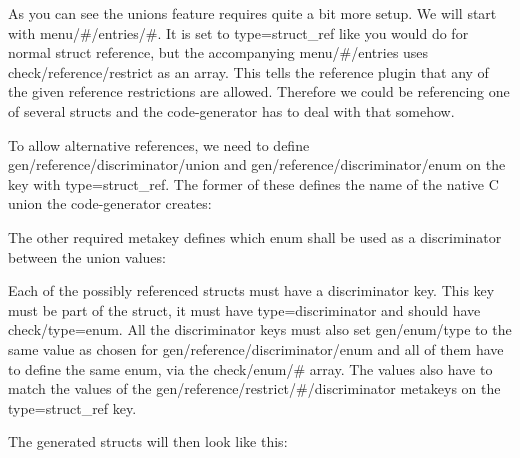 As you can see the unions feature requires quite a bit more setup. We will start with {\ttfamily menu/\#/entries/\#}. It is set to {\ttfamily type=struct\+\_\+ref} like you would do for normal struct reference, but the accompanying {\ttfamily menu/\#/entries} uses {\ttfamily check/reference/restrict} as an array. This tells the {\ttfamily reference} plugin that any of the given reference restrictions are allowed. Therefore we could be referencing one of several structs and the code-\/generator has to deal with that somehow.

To allow alternative references, we need to define {\ttfamily gen/reference/discriminator/union} and {\ttfamily gen/reference/discriminator/enum} on the key with {\ttfamily type=struct\+\_\+ref}. The former of these defines the name of the native C {\ttfamily union} the code-\/generator creates\+:


\begin{DoxyCode}{0}
\DoxyCodeLine{\textcolor{keyword}{typedef} \textcolor{keyword}{union }\{}
\end{DoxyCode}


The other required metakey defines which enum shall be used as a discriminator between the union values\+:


\begin{DoxyCode}{0}
\DoxyCodeLine{\textcolor{keyword}{typedef} \textcolor{keyword}{enum} \{}
\end{DoxyCode}


Each of the possibly referenced structs must have a discriminator key. This key must be part of the struct, it must have {\ttfamily type=discriminator} and should have {\ttfamily check/type=enum}. All the discriminator keys must also set {\ttfamily gen/enum/type} to the same value as chosen for {\ttfamily gen/reference/discriminator/enum} and all of them have to define the same enum, via the {\ttfamily check/enum/\#} array. The values also have to match the values of the {\ttfamily gen/reference/restrict/\#/discriminator} metakeys on the {\ttfamily type=struct\+\_\+ref} key.

The generated structs will then look like this\+:


\begin{DoxyCode}{0}
\DoxyCodeLine{\{}
\DoxyCodeLine{}
\DoxyCodeLine{\{}
\end{DoxyCode}


